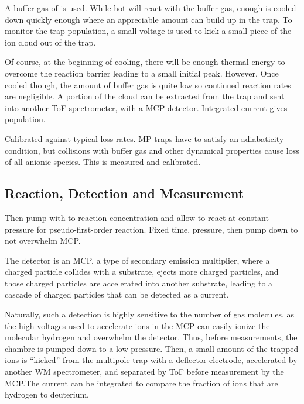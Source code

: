 \documentclass[12pt]{article}
\begin{document}
A buffer gas of  is used. While hot  will react with the  buffer gas, enough is cooled down quickly enough where an appreciable amount can build up in the trap. To monitor the trap population, a small voltage is used to kick a small piece of the ion cloud out of the trap.

Of course, at the beginning of cooling, there will be enough thermal energy to overcome the reaction barrier leading to a small initial  peak. However, Once cooled though, the amount of buffer gas is quite low so continued reaction rates are negligible. A portion of the cloud can be extracted from the trap and sent into another ToF spectrometer, with a MCP detector. Integrated current gives population.

Calibrated against typical loss rates. MP traps have to satisfy an adiabaticity condition, but collisions with buffer gas and other dynamical properties cause loss of all anionic species. This is measured and calibrated.


\subsection{Reaction, Detection and Measurement}
Then pump with  to reaction concentration and allow to react at constant pressure for pseudo-first-order reaction. Fixed time, pressure, then pump down to not overwhelm MCP.\@

The detector is an MCP, a type of secondary emission multiplier, where a charged particle collides with a substrate, ejects more charged particles, and those charged particles are accelerated into another substrate, leading to a cascade of charged particles that can be detected as a current.

Naturally, such a detection is highly sensitive to the number of gas molecules, as the high voltages used to accelerate ions in the MCP can easily ionize the molecular hydrogen and overwhelm the detector. Thus, before measurements, the chambre is pumped down to a low  pressure. Then, a small amount of the trapped ions is ``kicked'' from the multipole trap with a deflector electrode, accelerated by another WM spectrometer, and separated by ToF before measurement by the MCP.\@ The current can be integrated to compare the fraction of ions that are hydrogen to deuterium. 
\end{document}
